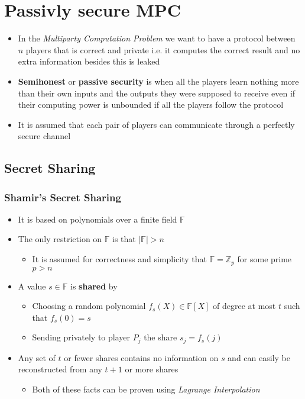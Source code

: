 \section{Passivly secure MPC}
\begin{itemize}
  \item In the \textit{Multiparty Computation Problem} we want to have a protocol between $n$ players that is correct and private i.e. it computes the correct result and no extra information besides this is leaked
  \item \textbf{Semihonest} or \textbf{passive security} is when all the players learn nothing more than their own inputs and the outputs they were supposed to receive even if their computing power is unbounded if all the players follow the protocol
  \item It is assumed that each pair of players can communicate through a perfectly secure channel
\end{itemize}

\subsection{Secret Sharing}
\subsubsection{Shamir's Secret Sharing}
\begin{itemize}
  \item It is based on polynomials over a finite field $\mathbb F$
  \item The only restriction on $\mathbb F$ is that $|\mathbb F| > n$
  \begin{itemize}
    \item It is assumed for correctness and simplicity that $\mathbb F = \mathbb Z_p$ for some prime $p>n$
  \end{itemize}
  \item A value $s \in \mathbb F$ is \textbf{shared} by
  \begin{itemize}
    \item Choosing a random polynomial $f_s(X) \in \mathbb F[X]$ of degree at most $t$ such that $f_s(0) = s$
    \item Sending privately to player $P_j$ the share $s_j = f_s(j)$
  \end{itemize}
  \item Any set of $t$ or fewer shares contains no information on $s$ and can easily be reconstructed from any $t+1$ or more shares
  \begin{itemize}
  	\item Both of these facts can be proven using \textit{Lagrange Interpolation}
  \end{itemize}
\end{itemize}


